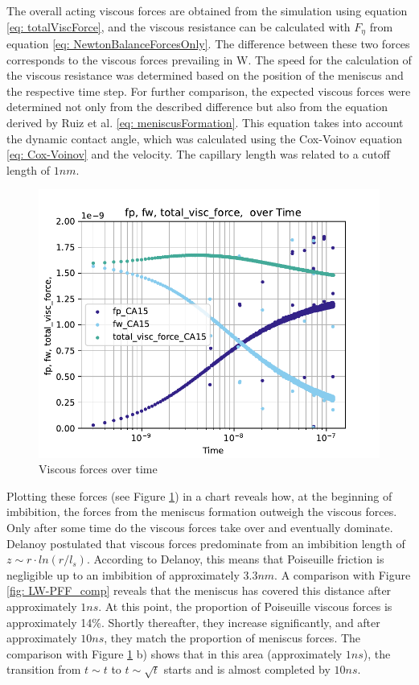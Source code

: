 The overall acting viscous forces are obtained from the simulation using equation \ref{eq: totalViscForce}, and the viscous resistance can be calculated with \( F_{\eta} \) from equation \ref{eq: NewtonBalanceForcesOnly}. The difference between these two forces corresponds to the viscous forces prevailing in \( \mathrm{W} \). 
The speed for the calculation of the viscous resistance was determined based on the position of the meniscus and the respective time step. For further comparison, the expected viscous forces were determined not only from the described difference but also from the equation derived by Ruiz et al. \cite{ruiz-gutierrez2022LongCrossoverDynamics} \ref*{eq: meniscusFormation}. This equation takes into account the dynamic contact angle, which was calculated using the Cox-Voinov equation \ref*{eq: Cox-Voinov} and the velocity. The capillary length was related to a cutoff length of \(1 nm\).

\begin{figure}[h]
    \centering
    \includegraphics[width=.95\textwidth]{Pictures/loglog_fp_fw_total_visc_force_overTime.pdf}
    \caption{Viscous forces over time}
    \label{fig: forcesOverTime}
\end{figure}

Plotting these forces (see Figure \ref*{fig: forcesOverTime}) in a chart reveals how, at the beginning of imbibition, the forces from the meniscus formation outweigh the viscous forces. Only after some time do the viscous forces take over and eventually dominate. Delanoy postulated that viscous forces predominate from an imbibition length of \( z \sim r \cdot ln(r/l_s) \). According to Delanoy, this means that Poiseuille friction is negligible up to an imbibition of approximately \(3.3nm\). A comparison with Figure \ref*{fig: LW-PFF_comp} reveals that the meniscus has covered this distance after approximately \(1ns\). At this point, the proportion of Poiseuille viscous forces is approximately 14\%. Shortly thereafter, they increase significantly, and after approximately \(10ns\), they match the proportion of meniscus forces. The comparison with Figure \ref*{fig: forcesOverTime} b) shows that in this area (approximately \(1ns\)), the transition from \( t\sim t \) to \( t\sim \sqrt{t} \) starts and is almost completed by \( 10ns \).

